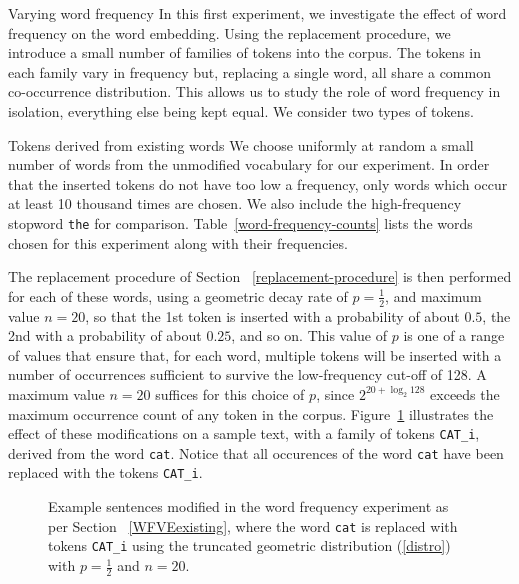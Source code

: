 \documentclass{article} %
\newcommand{\word}[1]{\texttt{#1}}
\begin{document}
\begin{section}{Varying word frequency}\label{WFVE}
In this first experiment, we investigate the effect of word frequency on
the word embedding.  Using the replacement procedure, we introduce a
small number of families of tokens into the corpus.  The tokens in each
family vary in frequency but, replacing a single word, all share a
common co-occurrence distribution.  This allows us to study the role of
word frequency in isolation, everything else being kept equal.  We
consider two types of tokens.

\begin{subsection}{Tokens derived from existing words}\label{WFVEexisting}
%
We choose uniformly at random a small number of words from the
unmodified vocabulary for our experiment.  In order that the inserted
tokens do not have too low a frequency, only words which occur at least
10 thousand times are chosen.  We also include the high-frequency
stopword \word{the} for comparison.  Table~\ref{word-frequency-counts}
lists the words chosen for this experiment along with their frequencies.

The replacement procedure of Section ~\ref{replacement-procedure} is then
performed for each of these words, using a geometric decay rate of $p =
\tfrac{1}{2}$, and maximum value $n=20$, so that the 1st token is
inserted with a probability of about $0.5$, the 2nd with a probability of
about $0.25$, and so on.  This value of $p$ is one of a range of values
that ensure that, for each word, multiple tokens will be inserted with a
number of occurrences sufficient to survive the low-frequency cut-off of
128.  A maximum value $n=20$ suffices for this choice of $p$, since
$2^{20 + \log_2{128}}$ exceeds the maximum occurrence count of any token in
the corpus.  Figure~\ref{fig:word-frequency-experiment-text-cat}
illustrates the effect of these modifications on a sample text, with a
family of tokens \word{CAT\_i}, derived from the word \word{cat}.
Notice that all occurences of the word \word{cat} have been replaced
with the tokens \word{CAT\_i}.

\begin{table}
	
	\caption{Term frequency $tf$ of words chosen for the word
          frequency experiment. }
	\label{word-frequency-counts}
\end{table}

\begin{figure}
	\begin{mdframed}
	
	\end{mdframed}
	\caption{Example sentences modified in the word frequency
          experiment as per Section ~\ref{WFVEexisting}, where the word
          \word{cat} is replaced with tokens \word{CAT\_i} using the
          truncated geometric distribution (\ref{distro}) with
          $p=\tfrac{1}{2}$ and $n=20$.}
	\label{fig:word-frequency-experiment-text-cat}
\end{figure}


\end{subsection}
\end{section}
\end{document}
